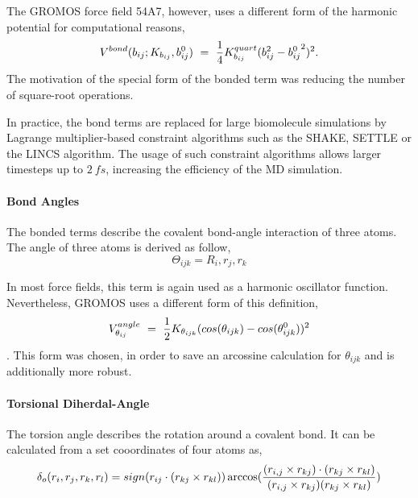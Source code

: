 The GROMOS force field 54A7, however, uses a different form of the harmonic potential for computational reasons, \cite{Oostenbrink2004}
\begin{equation}
    V^{bond}(b_{ij}; K_{b_{ij}}, b^0_{ij})~=~\frac{1}{4} K^{quart}_{b_{ij}} (b_{ij}^2-{b_{ij}^{0}}^2)^2. \\
\end{equation}
The motivation of the special form of the bonded term  was reducing the number of square-root operations. \cite{}

In practice, the bond terms are replaced for large biomolecule simulations by Lagrange multiplier-based constraint algorithms such as the SHAKE\cite{Ryckaert1977, Ciccotti1986}, SETTLE\cite{Miyamoto1992} or the LINCS\cite{Hess1997} algorithm. \cite{} 
The usage of such constraint algorithms allows larger timesteps up to $2~fs$, increasing the efficiency of the MD simulation. \cite{}

\paragraph{Bond Angles}
The bonded terms describe the covalent bond-angle  interaction of three atoms. The angle of three atoms is derived as follow,
\begin{equation}
    \Theta_{ijk} = R_i, r_j, r_k
\end{equation}

In most force fields, this term is again used as a harmonic oscillator function. Nevertheless, GROMOS uses a different form of this definition,
\begin{equation}
    V^{angle}_{\theta_{ij}}~=~ \frac{1}{2} K_{\theta_{ijk}}(cos(\theta_{ijk})-cos(\theta^0_{ijk}))^2 \\
\end{equation}. \cite{Oostenbrink2004}
This form was chosen, in order to save an arcossine calculation for $\theta_{ijk}$ and is additionally  more robust. \cite{Oostenbrink2004}

\paragraph{Torsional Diherdal-Angle}
The torsion angle describes the rotation around a covalent bond. \cite{} It can be calculated from a set cooordinates of four atoms as,
\begin{equation}
    \delta_{o}(r_i, r_j, r_k, r_l) = sign(r_{ij} \cdot (r_{kj} \times r_{kl})) \arccos(\frac{(r_{i,j}\times r_{kj}) \cdot (r_{kj} \times r_{kl})}{(r_{i,j} \times r_{kj}) (r_{kj} \times r_{kl})}) \\
\label{eq:tangle}
\end{equation} 

